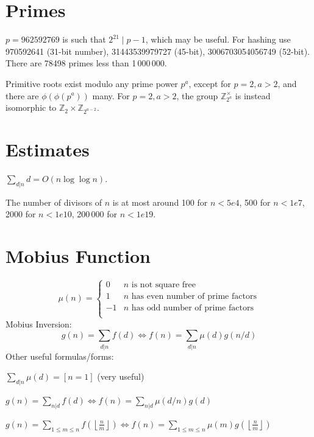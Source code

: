 \section{Primes}
	$p=962592769$ is such that $2^{21} \mid p-1$, which may be useful. For hashing
	use 970592641 (31-bit number), 31443539979727 (45-bit), 3006703054056749
	(52-bit). There are 78498 primes less than 1\,000\,000.

	Primitive roots exist modulo any prime power $p^a$, except for $p = 2, a > 2$, and there are $\phi(\phi(p^a))$ many.
	For $p = 2, a > 2$, the group $\mathbb Z_{2^a}^\times$ is instead isomorphic to $\mathbb Z_2 \times \mathbb Z_{2^{a-2}}$.

\section{Estimates}
	$\sum_{d|n} d = O(n \log \log n)$.

	The number of divisors of $n$ is at most around 100 for $n < 5e4$, 500 for $n < 1e7$, 2000 for $n < 1e10$, 200\,000 for $n < 1e19$.

\section{Mobius Function}
\[
	\mu(n) = \begin{cases} 0 & n \textrm{ is not square free}\\ 1 & n \textrm{ has even number of prime factors}\\ -1 & n \textrm{ has odd number of prime factors}\\\end{cases}
\]
  Mobius Inversion:
  \[ g(n) = \sum_{d|n} f(d) \Leftrightarrow f(n) = \sum_{d|n} \mu(d)g(n/d) \]
  Other useful formulas/forms:

  $ \sum_{d | n} \mu(d) = [ n = 1] $ (very useful)

  $ g(n) = \sum_{n|d} f(d) \Leftrightarrow f(n) = \sum_{n|d} \mu(d/n)g(d)$

 $ g(n) = \sum_{1 \leq m \leq n} f(\left\lfloor\frac{n}{m}\right \rfloor ) \Leftrightarrow f(n) = \sum_{1\leq m\leq n} \mu(m)g(\left\lfloor\frac{n}{m}\right\rfloor)$
